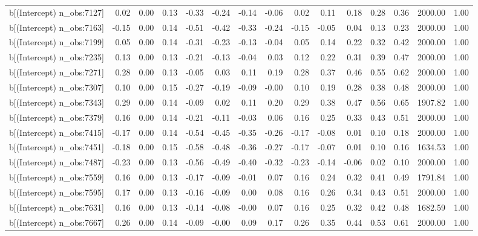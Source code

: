 \begin{table}[ht]
\begin{tabular}{rrrrrrrrrrrrrrr}
  b[(Intercept) n\_obs:7127] & 0.02 & 0.00 & 0.13 & -0.33 & -0.24 & -0.14 & -0.06 & 0.02 & 0.11 & 0.18 & 0.28 & 0.36 & 2000.00 & 1.00 \\ 
  b[(Intercept) n\_obs:7163] & -0.15 & 0.00 & 0.14 & -0.51 & -0.42 & -0.33 & -0.24 & -0.15 & -0.05 & 0.04 & 0.13 & 0.23 & 2000.00 & 1.00 \\ 
  b[(Intercept) n\_obs:7199] & 0.05 & 0.00 & 0.14 & -0.31 & -0.23 & -0.13 & -0.04 & 0.05 & 0.14 & 0.22 & 0.32 & 0.42 & 2000.00 & 1.00 \\ 
  b[(Intercept) n\_obs:7235] & 0.13 & 0.00 & 0.13 & -0.21 & -0.13 & -0.04 & 0.03 & 0.12 & 0.22 & 0.31 & 0.39 & 0.47 & 2000.00 & 1.00 \\ 
  b[(Intercept) n\_obs:7271] & 0.28 & 0.00 & 0.13 & -0.05 & 0.03 & 0.11 & 0.19 & 0.28 & 0.37 & 0.46 & 0.55 & 0.62 & 2000.00 & 1.00 \\ 
  b[(Intercept) n\_obs:7307] & 0.10 & 0.00 & 0.15 & -0.27 & -0.19 & -0.09 & -0.00 & 0.10 & 0.19 & 0.28 & 0.38 & 0.48 & 2000.00 & 1.00 \\ 
  b[(Intercept) n\_obs:7343] & 0.29 & 0.00 & 0.14 & -0.09 & 0.02 & 0.11 & 0.20 & 0.29 & 0.38 & 0.47 & 0.56 & 0.65 & 1907.82 & 1.00 \\ 
  b[(Intercept) n\_obs:7379] & 0.16 & 0.00 & 0.14 & -0.21 & -0.11 & -0.03 & 0.06 & 0.16 & 0.25 & 0.33 & 0.43 & 0.51 & 2000.00 & 1.00 \\ 
  b[(Intercept) n\_obs:7415] & -0.17 & 0.00 & 0.14 & -0.54 & -0.45 & -0.35 & -0.26 & -0.17 & -0.08 & 0.01 & 0.10 & 0.18 & 2000.00 & 1.00 \\ 
  b[(Intercept) n\_obs:7451] & -0.18 & 0.00 & 0.15 & -0.58 & -0.48 & -0.36 & -0.27 & -0.17 & -0.07 & 0.01 & 0.10 & 0.16 & 1634.53 & 1.00 \\ 
  b[(Intercept) n\_obs:7487] & -0.23 & 0.00 & 0.13 & -0.56 & -0.49 & -0.40 & -0.32 & -0.23 & -0.14 & -0.06 & 0.02 & 0.10 & 2000.00 & 1.00 \\ 
  b[(Intercept) n\_obs:7559] & 0.16 & 0.00 & 0.13 & -0.17 & -0.09 & -0.01 & 0.07 & 0.16 & 0.24 & 0.32 & 0.41 & 0.49 & 1791.84 & 1.00 \\ 
  b[(Intercept) n\_obs:7595] & 0.17 & 0.00 & 0.13 & -0.16 & -0.09 & 0.00 & 0.08 & 0.16 & 0.26 & 0.34 & 0.43 & 0.51 & 2000.00 & 1.00 \\ 
  b[(Intercept) n\_obs:7631] & 0.16 & 0.00 & 0.13 & -0.14 & -0.08 & -0.00 & 0.07 & 0.16 & 0.25 & 0.32 & 0.42 & 0.48 & 1682.59 & 1.00 \\ 
  b[(Intercept) n\_obs:7667] & 0.26 & 0.00 & 0.14 & -0.09 & -0.00 & 0.09 & 0.17 & 0.26 & 0.35 & 0.44 & 0.53 & 0.61 & 2000.00 & 1.00 \\ 

\end{tabular}
\end{table}
